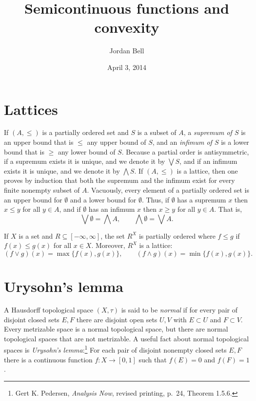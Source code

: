 \documentclass{article}
\theoremstyle{definition}
\begin{document}
\title{Semicontinuous functions and convexity}
\author{Jordan Bell}
\date{April 3, 2014}

\maketitle

\section{Lattices}
If $(A,\leq)$ is a partially ordered set and $S$ is a subset of $A$, a {\em supremum of $S$} is an upper bound that is $\leq$ any upper
bound of $S$, and an {\em infimum of $S$} is a lower bound that is $\geq$ any lower bound of $S$. 
Because a partial order is antisymmetric, if a supremum exists it is unique, and we denote it by $\bigvee S$, and if an infimum exists it is unique, and
we denote it by $\bigwedge S$.
 If $(A,\leq)$ is a lattice, then one proves by induction that both the supremum and the infimum exist for every finite nonempty subset of $A$. 
Vacuously, every element of a partially ordered set is an upper bound for $\emptyset$ and a lower bound for $\emptyset$. Thus, if $\emptyset$ has a supremum $x$
then $x \leq y$ for all $y \in A$, and if $\emptyset$ has an infimum $x$ then $x \geq y$ for all $y \in A$. That is,
\[
\bigvee \emptyset = \bigwedge A, \qquad \bigwedge \emptyset =  \bigvee A.
\]


If $X$ is a set and $R \subseteq [-\infty,\infty]$, the set $R^X$ is partially ordered where $f \leq g$ if
$f(x) \leq g(x)$ for all $x \in X$. Moreover,  $R^X$  is a lattice: 
\[
(f \vee g)(x) = \max \{f(x),g(x)\}, \qquad (f \wedge g)(x) = \min\{ f(x),g(x)\}.
\]


\section{Urysohn's lemma}
A Hausdorff topological space $(X,\tau)$ is said to be  {\em normal} if for every pair of disjoint closed sets $E,F$ there are disjoint open sets $U,V$ with
$E \subset U$ and $F \subset V$. Every metrizable space is a normal topological space, but there are normal topological spaces that are not metrizable. 
A useful fact about normal topological spaces is {\em Urysohn's lemma}:\footnote{Gert K. Pedersen,
{\em Analysis Now}, revised printing, p.~24, Theorem 1.5.6.} For each pair of disjoint nonempty closed sets $E,F$ there is a continuous function
$f:X \to [0,1]$ such that $f(E)=0$ and $f(F)=1$.
\end{document}
